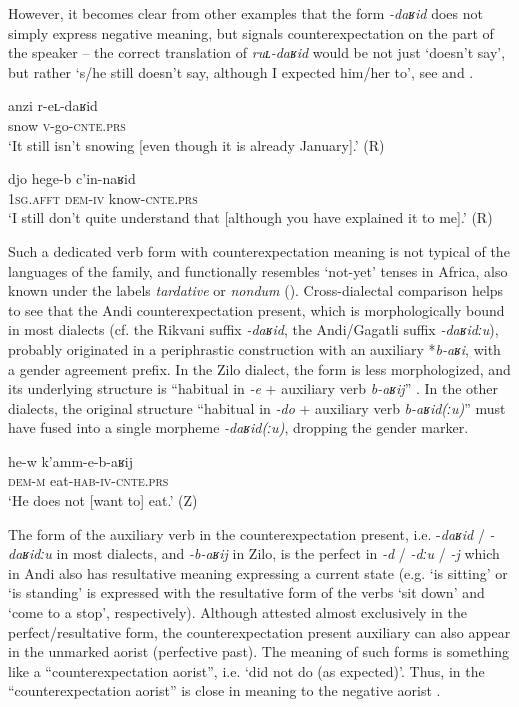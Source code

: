 \documentclass[output=paper,colorlinks=true, citecolor=brown]{langscibook}
\begin{document}
However, it becomes clear from other examples that the form \textit{{}-daʁid} does not simply express negative meaning, but signals counterexpectation on the part of the speaker – the correct translation of \textit{ruʟ-daʁid} would be not just ‘doesn’t say’, but rather ‘s/he still doesn’t say, although I expected him/her to’, see  and . 

\ea 
    \label{ex:and:41}
    \gll anzi r-eʟ-daʁid\\
          snow \textsc{v}{}-go-\textsc{cnte.prs} \\
    \glt ‘It still isn’t snowing [even though it is already January].’ (R)
\z 

\ea 
    \label{ex:and:42}
    \gll djo hege-b c’in-naʁid\\
          \textsc{1sg.afft} \textsc{dem-iv} know-\textsc{cnte.prs} \\
    \glt  ‘I still don’t quite understand that [although you have explained it to me].’ (R)
\z 

Such a dedicated verb form with counterexpectation meaning is not typical of the languages of the family, and functionally resembles ‘not-yet’ tenses in Africa, also known under the labels \textit{tardative} \citep[319]{Plungian1999} or \textit{nondum} (\citealt{VeselinovaDevos2021}). Cross-dialectal comparison helps to see that the Andi counterexpectation present, which is morphologically bound in most dialects (cf. the Rikvani suffix \textit{{}-daʁid}, the Andi/Gagatli suffix \textit{{}-daʁidːu}), probably originated in a periphrastic construction with an auxiliary *\textit{b-aʁi}, with a gender agreement prefix. In the Zilo dialect, the form is less morphologized, and its underlying structure is “habitual in \textit{{}-e} + auxiliary verb \textit{b-aʁij}” . In the other dialects, the original structure “habitual in \textit{{}-do} + auxiliary verb \textit{b\nobreakdash-aʁid(ːu)}” must have fused into a single morpheme \textit{{}-daʁid(ːu)}, dropping the gender marker.

\ea
    \label{ex:and:43}
    \gll he-w k’amm{}-e-b-aʁij\\
          \textsc{dem-m} eat-\textsc{hab-iv-cnte.prs} \\
    \glt ‘He does not [want to] eat.’ (Z)
\z 

The form of the auxiliary verb in the counterexpectation present, i.e. \nobreakdash-\textit{daʁid} / \textit{{}-daʁidːu} in most dialects, and \textit{{}-b-aʁij} in Zilo, is the perfect in \textit{{}-d} / \textit{{}-dːu} / \textit{{}-j} which in Andi also has resultative meaning expressing a current state (e.g. ‘is sitting’ or ‘is standing’ is expressed with the resultative form of the verbs ‘sit down’ and ‘come to a stop’, respectively). Although attested almost exclusively in the perfect/resultative form, the counterexpectation present auxiliary can also appear in the unmarked aorist (perfective past). The meaning of such forms is something like a “counterexpectation aorist”, i.e. ‘did not do (as expected)’. Thus, in  the “counterexpectation aorist”  is close in meaning to the negative aorist .
\end{document}
